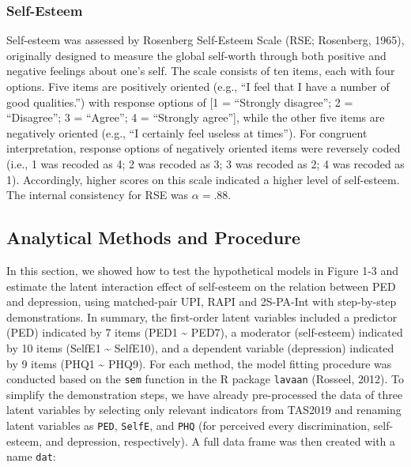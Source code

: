\documentclass[
  man]{apa7}
\begin{document}
\hypertarget{self-esteem}{%
\subsubsection{Self-Esteem}\label{self-esteem}}

Self-esteem was assessed by Rosenberg Self-Esteem Scale (RSE; Rosenberg, 1965), originally designed to measure the global self-worth through both positive and negative feelings about one's self. The scale consists of ten items, each with four options. Five items are positively oriented (e.g., ``I feel that I have a number of good qualities.'') with response options of {[}1 = ``Strongly disagree''; 2 = ``Disagree''; 3 = ``Agree''; 4 = ``Strongly agree''{]}, while the other five items are negatively oriented (e.g., ``I certainly feel useless at times''). For congruent interpretation, response options of negatively oriented items were reversely coded (i.e., 1 was recoded as 4; 2 was recoded as 3; 3 was recoded as 2; 4 was recoded as 1). Accordingly, higher scores on this scale indicated a higher level of self-esteem. The internal consistency for RSE was \(\alpha = .88\).

\hypertarget{analytical-methods-and-procedure}{%
\subsection{Analytical Methods and Procedure}\label{analytical-methods-and-procedure}}

In this section, we showed how to test the hypothetical models in Figure 1-3 and estimate the latent interaction effect of self-esteem on the relation between PED and depression, using matched-pair UPI, RAPI and 2S-PA-Int with step-by-step demonstrations. In summary, the first-order latent variables included a predictor (PED) indicated by 7 items (PED1 \textasciitilde{} PED7), a moderator (self-esteem) indicated by 10 items (SelfE1 \textasciitilde{} SelfE10), and a dependent variable (depression) indicated by 9 items (PHQ1 \textasciitilde{} PHQ9). For each method, the model fitting procedure was conducted based on the \texttt{sem} function in the R package \texttt{lavaan} (Rosseel, 2012). To simplify the demonstration steps, we have already pre-processed the data of three latent variables by selecting only relevant indicators from TAS2019 and renaming latent variables as \texttt{PED}, \texttt{SelfE}, and \texttt{PHQ} (for perceived every discrimination, self-esteem, and depression, respectively). A full data frame was then created with a name \texttt{dat}:
\end{document}
